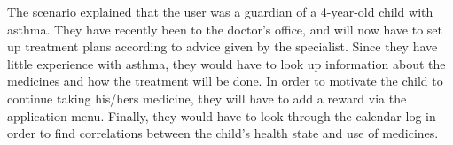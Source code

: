The scenario explained that the user was a guardian of a 4-year-old child with asthma. They have recently been to the doctor's office, and will now have to set up treatment plans according to advice given by the specialist. Since they have little experience with asthma, they would have to look up information about the medicines and how the treatment will be done. In order to motivate the child to continue taking his/hers medicine, they will have to add a reward via the application menu. Finally, they would have to look through the calendar log in order to find correlations between the child's health state and use of medicines. 

